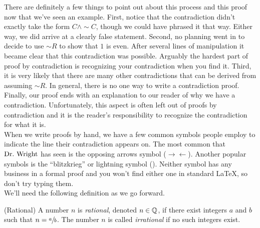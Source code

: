 \noindent  There are definitely a few things to point out about this process and this proof now that we've seen an example.  First, notice that the contradiction didn't exactly take the form $C \wedge \sim C$, though we could have phrased it that way.  Either way, we did arrive at a clearly false statement.  Second, no planning went in to decide to use $\sim R$ to show that $1$ is even.  After several lines of manipulation it became clear that this contradiction was possible.  Arguably the hardest part of proof by contradiction is recognizing your contradiction when you find it.  Third, it is very likely that there are many other contradictions that can be derived from assuming $\sim R$.  In general, there is no one way to write a contradiction proof.  Finally, our proof ends with an explanation to our reader of why we have a contradiction.  Unfortunately, this aspect is often left out of proofs by contradiction and it is the reader's responsibility to recognize the contradiction for what it is.\\

\noindent When we write proofs by hand, we have a few common symbols people employ to indicate the line their contradiction appears on.  The most common that $\text{Dr.~Wright}$ has seen is the opposing arrows symbol ($\rightarrow\!\leftarrow$).  Another popular symbols is the ``blitzkrieg'' or lightning symbol (\lightning).  Neither symbol has any business in a formal proof and you won't find either one in standard LaTeX, so don't try typing them.\\

\noindent We'll need the following definition as we go forward.

\begin{definition}(Rational)  A number $n$ is \textit{rational}, denoted $n \in \mathbb{Q}$, if there exist integers $a$ and $b$ such that $n = \sfrac{a}{b}$.  The number $n$ is called \textit{irrational} if no such integers exist.
\end{definition}

